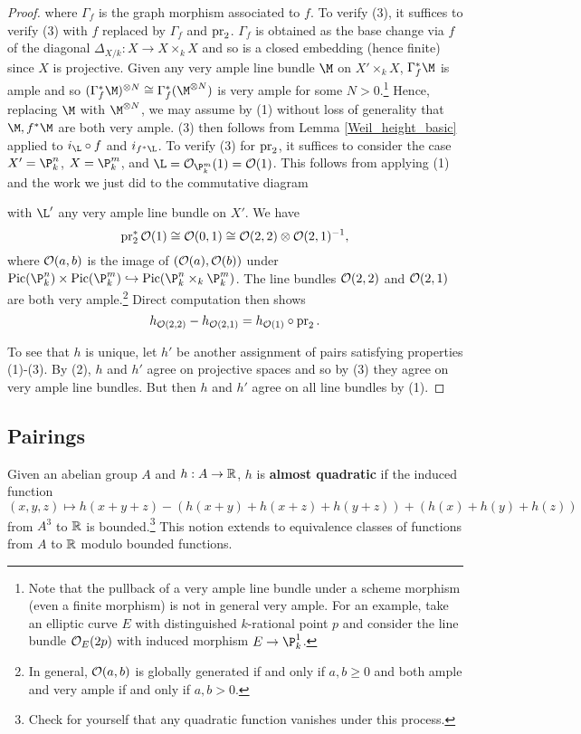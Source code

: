 \documentclass[11pt]{article}
\begin{document}
\begin{proof}
where $\Gamma_f$ is the graph morphism associated to $f$. To verify (3), it suffices to verify (3) with $f$ replaced by $\Gamma_f$ and $\operatorname{pr}_2$. $\Gamma_f$ is obtained as the base change via $f$ of the diagonal $\Delta_{X/k}: X\to X\times_kX$ and so is a closed embedding (hence finite) since $X$ is projective. Given any very ample line bundle $\M$ on $X'\times_kX$, $\Gamma_f^*\M$ is ample and so $(\Gamma_f^*\M)^{\tensor N}\iso\Gamma_f^*(\M^{\tensor N})$ is very ample for some $N>0$.\footnote{Note that the pullback of a very ample line bundle under a scheme morphism (even a finite morphism) is not in general very ample. For an example, take an elliptic curve $E$ with distinguished $k$-rational point $p$ and consider the line bundle $\mathcal{O}_E(2p)$ with induced morphism $E\to\P_k^1$.} Hence, replacing $\M$ with $\M^{\tensor N}$, we may assume by (1) without loss of generality that $\M,f^*\M$ are both very ample. (3) then follows from Lemma \ref{Weil_height_basic} applied to $i_{\L}\circ f$ and $i_{f^*\L}$. To verify (3) for $\operatorname{pr}_2$, it suffices to consider the case $X'=\P_k^n$, $X=\P_k^m$, and $\L=\O_{\P_k^m}(1)=\O(1)$. This follows from applying (1) and the work we just did to the commutative diagram
\begin{center}
\end{center}
with $\L'$ any very ample line bundle on $X'$. We have 
$$\operatorname{pr}_2^*\mathcal{O}(1)\cong\mathcal{O}(0,1)\cong\mathcal{O}(2,2)\otimes\mathcal{O}(2,1)^{-1},$$
where $\mathcal{O}(a,b)$ is the image of $(\mathcal{O}(a),\mathcal{O}(b))$ under $\Pic(\P_k^n)\times\Pic(\P_k^m)\inj\Pic(\P_k^n\times_k\P_k^m)$. The line bundles $\mathcal{O}(2,2)$ and $\mathcal{O}(2,1)$ are both very ample.\footnote{In general, $\mathcal{O}(a,b)$ is globally generated if and only if $a,b\geq0$ and both ample and very ample if and only if $a,b>0$.} Direct computation then shows 
$$h_{\mathcal{O}(2,2)}-h_{\mathcal{O}(2,1)}=h_{\mathcal{O}(1)}\circ\operatorname{pr}_2.$$

To see that $h$ is unique, let $h'$ be another assignment of pairs satisfying properties (1)-(3). By (2), $h$ and $h'$ agree on projective spaces and so by (3) they agree on very ample line bundles. But then $h$ and $h'$ agree on all line bundles by (1).
\end{proof}

\subsection{Pairings}
Given an abelian group $A$ and $h: A\to\mathbb{R}$, $h$ is \textbf{almost quadratic} if the induced function 
$$(x,y,z)\mapsto h(x+y+z)-(h(x+y)+h(x+z)+h(y+z))+(h(x)+h(y)+h(z))$$ 
from $A^3$ to $\mathbb{R}$ is bounded.\footnote{Check for yourself that any quadratic function vanishes under this process.} This notion extends to equivalence classes of functions from $A$ to $\mathbb{R}$ modulo bounded functions.
\end{document}

